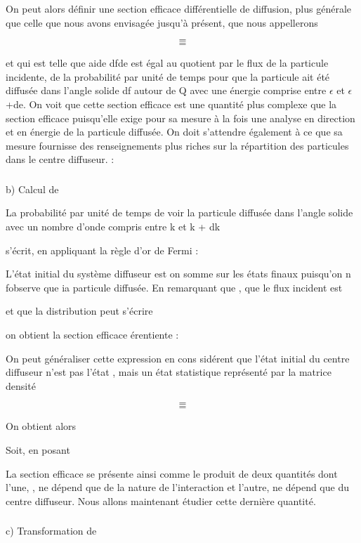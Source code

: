 On peut alors définir une section efficace différentielle de diffusion, plus générale
que celle que nous avons envisagée jusqu'à présent, que nous appellerons

\[
\tag{122}=
\]
\[
\tag{123}=
\]

 et qui est telle que aide dfde est égal au quotient par le flux
de la particule incidente, de la probabilité par unité de temps pour que la
particule ait été diffusée dans l'angle solide df autour de Q avec une énergie comprise
entre $\epsilon$ et $\epsilon$ +de. On voit que cette section efficace est une
quantité plus complexe que la section efficace puisqu'elle exige pour
sa mesure à la fois une analyse en direction et en énergie de la particule
diffusée. On doit s'attendre également à ce que sa mesure fournisse des
renseignements plus riches sur la répartition des particules dans le centre
diffuseur. :

\subsubsection{}%
b) Calcul de 

La probabilité par unité de temps de voir la particule diffusée
dans l'angle solide  avec un nombre d'onde compris entre k et k + dk

s'écrit, en appliquant la règle d'or de Fermi :

L'état initial du système diffuseur est  on somme sur les états finaux
 puisqu'on n fobserve que ia particule diffusée.
En remarquant que  , que le flux incident est 

et que la distribution  peut s'écrire

on obtient la section efficace érentiente :

On peut généraliser cette expression en cons sidérent que l'état initial du centre
diffuseur n'est pas l'état  , mais un état statistique représenté par la
matrice densité

\[
\tag{127}=
\]
\[
\tag{128}=
\]


On obtient alors

Soit, en posant

La section efficace se présente ainsi comme le produit de deux quantités dont
l'une, , ne dépend que de la nature de l'interaction et l'autre,
ne dépend que du centre diffuseur. Nous allons maintenant étudier cette dernière quantité.
\subsubsection{}%
c) Transformation de 

